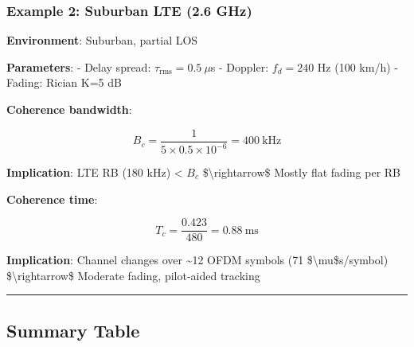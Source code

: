\subsubsection{Example 2: Suburban LTE (2.6
GHz)}\label{example-2-suburban-lte-2.6-ghz}

\textbf{Environment}: Suburban, partial LOS

\textbf{Parameters}: - Delay spread: \(\tau_{\text{rms}} = 0.5\ \mu\)s -
Doppler: \(f_d = 240\) Hz (100 km/h) - Fading: Rician K=5 dB

\textbf{Coherence bandwidth}:

\[
B_c = \frac{1}{5 \times 0.5 \times 10^{-6}} = 400\ \text{kHz}
\]

\textbf{Implication}: LTE RB (180 kHz) \textless{} \(B_c\)
\$\textbackslash rightarrow\$ Mostly flat fading per RB

\textbf{Coherence time}:

\[
T_c = \frac{0.423}{480} = 0.88\ \text{ms}
\]

\textbf{Implication}: Channel changes over \textasciitilde12 OFDM
symbols (71 \$\textbackslash mu\$s/symbol) \$\textbackslash rightarrow\$
Moderate fading, pilot-aided tracking

\begin{center}\rule{0.5\linewidth}{0.5pt}\end{center}

\subsection{Summary Table}\label{summary-table}

